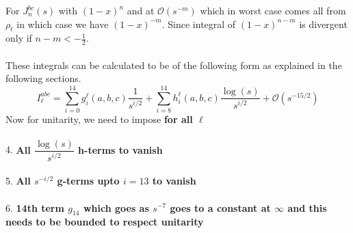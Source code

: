﻿\documentclass[12pt,a4paper]{article}
\begin{document}
For $J_{n}^{b c}(s)$ with $(1-x)^{n}$ and at $\mathcal{O}(s^{-m})$ which in worst case comes all from $\rho_{t}$ in which case we have $(1-x)^{-m}$. Since integral of $(1-x)^{n-m}$ is divergent only if $n-m<-\frac{1}{2}$.\\\\
These integrals can be calculated to be of the following form as explained in the following sections.
$$
I_{\ell}^{a b c}=\sum_{i=0}^{14} g_{i}^{\ell}(a, b, c) \frac{1}{s^{i / 2}}+\sum_{i=8}^{14} h_{i}^{\ell}(a, b, c) \frac{\log (s)}{s^{i / 2}}+\mathcal{O}\left(s^{-15 / 2}\right)
$$
Now for unitarity, we need to impose \textbf{for all $\ell$}\\\\
4. \textbf{All $\dfrac{\log (s)}{s^{i / 2}}$ h-terms to vanish}\\\\
5. \textbf{All  $s^{-i / 2}$ g-terms upto $i=13$ to vanish}\\\\
6. \textbf{14th term $g_{14}$ which goes as $s^{-7}$ goes to a constant at $\infty$ and this needs to be bounded to respect unitarity}
\end{document}
